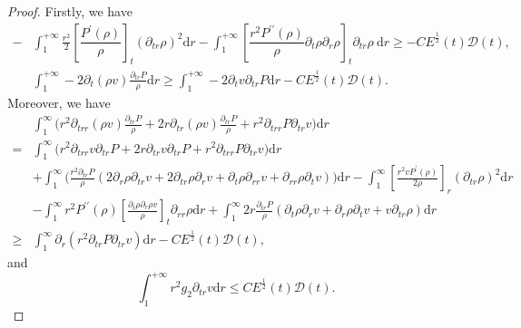 \documentclass[10pt,reqno]{amsart}
\numberwithin{equation}{section}
\begin{document}
\begin{proof}
		Firstly, we have
		\begin{equation}\nonumber
			\begin{aligned}
				-&\int_{1}^{+\infty}\frac{r^2}{2}[\dfrac{ P^{\prime}(\rho)}{\rho}]_t\left(\partial_{tr} \rho\right)^2\mathrm{d}r
				-\int_{1}^{+\infty} [\dfrac{r^2 P^{\prime\prime}(\rho)}{\rho} \partial_{t}\rho\partial_{r}\rho]_t\partial_{tr}\rho\mathrm{~d}r
				\geq -C E^{\frac{1}{2}}(t) \mathcal{D}(t),\\
				&\int_{1}^{+\infty}-2\partial_{t} (\rho v) \frac{\partial_{tr}P}{\rho}\mathrm{d}r
				\geq \int_{1}^{+\infty}-2\partial_{t}v\partial_{tr}P\mathrm{d}r
				-C E^{\frac{1}{2}}(t) \mathcal{D}(t).
			\end{aligned}
		\end{equation}
		Moreover, we have
		\begin{equation}\nonumber
			\begin{aligned}
				&\int_{1}^{\infty}\bigg(r^2\partial_{trr}\left(\rho v\right) \frac{\partial_{tr}P}{\rho}
				+2r \partial_{tr} (\rho v) \frac{\partial_{tr}P}{\rho}
				+r^2 \partial_{trr}P \partial_{tr}v\bigg)\mathrm{d}r\\
				=&\int_{1}^{\infty}\bigg(r^2\partial_{trr}v \partial_{tr}P+2r \partial_{tr} v \partial_{tr}P
				+r^2 \partial_{trr}P \partial_{tr}v\bigg)\mathrm{d}r\\
				&+\int_{1}^{\infty}\bigg(\frac{r^2\partial_{tr}P}{\rho}(2\partial_{r}\rho \partial_{tr} v+2\partial_{tr}\rho \partial_{r} v+\partial_{t}\rho \partial_{rr} v+\partial_{rr}\rho \partial_{t} v)\bigg)\mathrm{d}r
				-\int_{1}^{\infty}[\frac{r^2vP^{\prime}(\rho)}{2\rho}]_r(\partial_{tr}\rho)^2\mathrm{d}r\\
				&
				-\int_{1}^{\infty}r^2P^{\prime\prime}(\rho)[\frac{\partial_{t}\rho\partial_{r}\rho v}{\rho}]_t \partial_{rr}\rho\mathrm{d}r
				+\int_{1}^{\infty}2r \frac{\partial_{tr}P}{\rho}(\partial_{t}\rho \partial_{r} v+\partial_{r}\rho \partial_{t} v+v \partial_{tr}\rho)\mathrm{d} r\\
				\geq& \int_{1}^{\infty}\partial_{r}\left(r^2\partial_{tr}P\partial_{tr}v\right)\mathrm{d}r -C E^{\frac{1}{2}}(t) \mathcal{D}(t),
			\end{aligned}
		\end{equation}
		and
		\begin{equation}\nonumber
			\int_{1}^{+\infty}r^2g_2 \partial_{tr}v\mathrm{d}r\leq C E^{\frac{1}{2}}(t) \mathcal{D}(t).
		\end{equation}
		

\end{proof}
\end{document}
